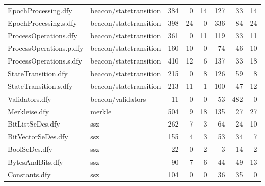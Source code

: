 \documentclass[a4paper, 12pt]{article}
\begin{document}
\begin{tabular}{llrrrrrr}
         EpochProcessing.dfy &        beacon/statetransition &   384 &         0 &               14 &            127 &             33 &      14 \\
       EpochProcessing.s.dfy &        beacon/statetransition &   398 &        24 &                0 &            336 &             84 &      24 \\
       ProcessOperations.dfy &        beacon/statetransition &   361 &         0 &               11 &            119 &             33 &      11 \\
     ProcessOperations.p.dfy &        beacon/statetransition &   160 &        10 &                0 &             74 &             46 &      10 \\
     ProcessOperations.s.dfy &        beacon/statetransition &   410 &        12 &                6 &            137 &             33 &      18 \\
         StateTransition.dfy &        beacon/statetransition &   215 &         0 &                8 &            126 &             59 &       8 \\
       StateTransition.s.dfy &        beacon/statetransition &   213 &        11 &                1 &            100 &             47 &      12 \\
              Validators.dfy &             beacon/validators &    11 &         0 &                0 &             53 &            482 &       0 \\
               Merkleise.dfy &                        merkle &   504 &         9 &               18 &            135 &             27 &      27 \\
            BitListSeDes.dfy &                           ssz &   262 &         7 &                3 &             64 &             24 &      10 \\
          BitVectorSeDes.dfy &                           ssz &   155 &         4 &                3 &             53 &             34 &       7 \\
               BoolSeDes.dfy &                           ssz &    22 &         0 &                2 &              3 &             14 &       2 \\
            BytesAndBits.dfy &                           ssz &    90 &         7 &                6 &             44 &             49 &      13 \\
               Constants.dfy &                           ssz &   104 &         0 &                0 &             36 &             35 &       0 \\

\end{tabular}
\end{document}

